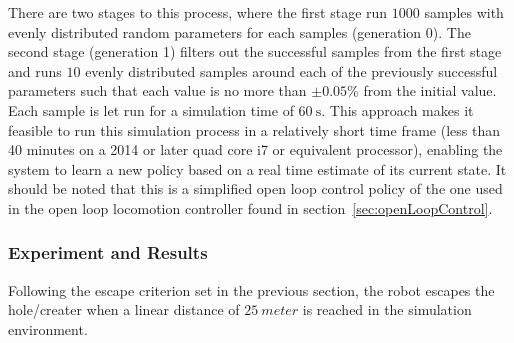 There are two stages to this process, where the first stage run \(1000\) samples with evenly distributed random parameters for each samples (generation 0).
The second stage (generation 1) filters out the successful samples from the first stage and runs \(10\) evenly distributed samples around each of the previously successful parameters such that each value is no more than $\pm 0.05$\% from the initial value.
Each sample is let run for a simulation time of \(\SI{60}{\second}\).
This approach makes it feasible to run this simulation process in a relatively short time frame (less than 40 minutes on a 2014 or later quad core i7 or equivalent processor), enabling the system to learn a new policy based on a real time estimate of its current state.
It should be noted that this is a simplified open loop control policy of the one used in the open loop locomotion controller found in section~\ref{sec:openLoopControl}.

\subsubsection{Experiment and Results}
Following the escape criterion set in the previous section, the robot escapes the hole/creater when a linear distance of \(\SI{25}{meter}\) is reached in the simulation environment.

